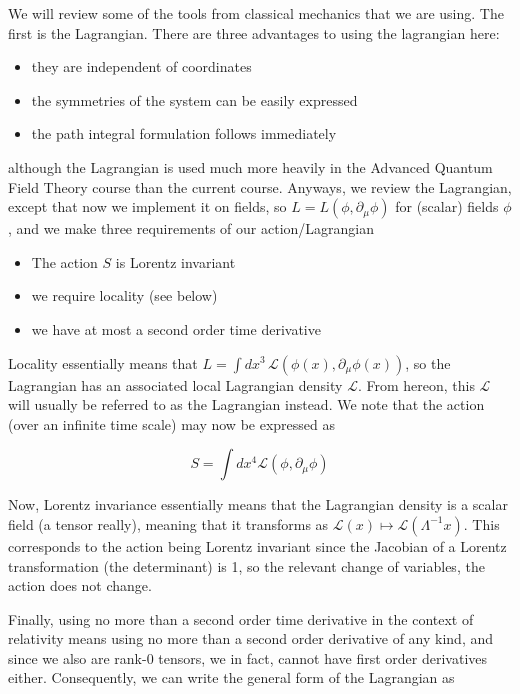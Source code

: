 \documentclass{article}
\theoremstyle{definition}
\begin{document}
We will review some of the tools from classical mechanics that we are using. The
first is the Lagrangian. There are three advantages to using the lagrangian
here:

\begin{itemize}
\item they are independent of coordinates
\item the symmetries of the system can be easily expressed
\item the path integral formulation follows immediately
\end{itemize}

although the Lagrangian is used much more heavily in the Advanced Quantum Field
Theory course than the current course. Anyways, we review the Lagrangian, except
that now we implement it on fields, so $L = L(\phi, \partial_\mu \phi)$ for
(scalar) fields $\phi$, and we make three requirements of our action/Lagrangian

\begin{itemize}
\item The action $S$ is Lorentz invariant
\item we require locality (see below)
\item we have at most a second order time derivative
\end{itemize}

Locality essentially means that $L = \int dx^3 \, \mathcal{L}(\phi(x),
\partial_\mu \phi(x))$, so the Lagrangian has an associated local Lagrangian
density $\mathcal{L}$. From hereon, this $\mathcal{L}$ will usually be referred
to as the Lagrangian instead. We note that the action (over an infinite time
scale) may now be expressed as

$$ S = \int dx^4 \mathcal{L}(\phi, \partial_\mu \phi) $$

Now, Lorentz invariance essentially means that the Lagrangian density is a
scalar field (a tensor really), meaning that it transforms as $\mathcal{L}(x)
\mapsto \mathcal{L}(\Lambda^{-1} x)$. This corresponds to the action being
Lorentz invariant since the Jacobian of a Lorentz transformation (the
determinant) is 1, so the relevant change of variables, the action does not
change.

Finally, using no more than a second order time derivative in the context of
relativity means using no more than a second order derivative of any kind, and
since we also are rank-0 tensors, we in fact, cannot have first order
derivatives either. Consequently, we can write the general form of the
Lagrangian as 
\end{document}
